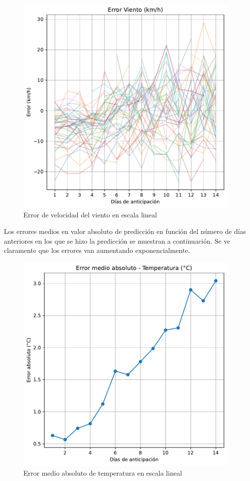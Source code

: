 \documentclass[
  10pt,
  a4paper,
  DIV=11,
  numbers=noendperiod,
  open=any]{scrreprt}
\numberwithin{equation}{chapter}
\numberwithin{equation}{section}
\renewcommand{\[}{\begin{equation}}
\renewcommand{\]}{\end{equation}}
\begin{document}
\begin{figure}[h]
  \centering
  \includegraphics[width=0.99\textwidth]{03-meteorologia/predicciones_files/figure-pdf/cell-2-output-4.pdf}
  \caption{Error de velocidad del viento en escala lineal}
\end{figure}

Los errores medios en valor absoluto de predicción en función del número
de días anteriores en los que se hizo la predicción se muestran a
continuación. Se ve claramente que los errores van aumentando
exponencialmente.

\begin{figure}[h]
  \centering
  \includegraphics[width=0.99\textwidth]{03-meteorologia/predicciones_files/figure-pdf/cell-3-output-1.pdf}
  \caption{Error medio absoluto de temperatura en escala lineal}
\end{figure}
\end{document}
